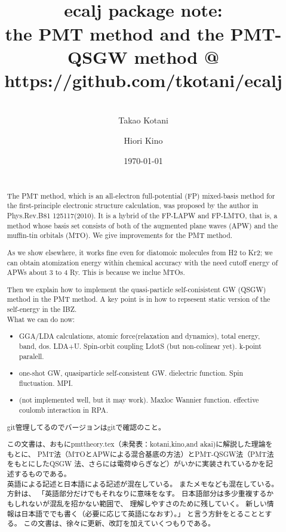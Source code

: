 \documentclass[a4paper,10pt,aip,onecolumn,amsmath,amssymb,floatfix,rmp]{revtex4-1}
\begin{document}
\title{{\Huge \ \\ ecalj package note:}\\ the PMT method and the
PMT-QSGW method  @ https://github.com/tkotani/ecalj}
\author{\large \ \\ Takao Kotani}
\author{\large Hiori Kino}
\date{\today}
\vspace{1cm}
\begin{abstract}
\ \\ The PMT method, which is an all-electron full-potential (FP) mixed-basis
method for the first-principle electronic structure calculation, was proposed 
by the author in Phys.Rev.B81 125117(2010). 
It is a hybrid of the FP-LAPW and FP-LMTO, that is, a method 
whose basis set consists of both of the augmented plane waves (APW) 
and the muffin-tin orbitals (MTO). We give improvements for the PMT
method. 

 As we show elsewhere, it works fine even for diatomoic molecules
from H2 to Kr2; we can obtain atomization energy within chemical
accuracy with the need cutoff energy of APWs about 3 to 4 Ry. This is
because we inclue MTOs.

Then we explain how to implement the quasi-particle
self-conisistent GW (QSGW) method in the PMT method.
A key point is in how to repsesent static version of the self-energy 
in the IBZ.\\

What we can do now:
\begin{itemize}
\item GGA/LDA calculations, atomic force(relaxation and dynamics), total
      energy, band, dos. LDA+U. Spin-orbit coupling LdotS (but
      non-colinear yet). k-point paralell.
\item one-shot GW, quasiparticle self-consistent GW. dielectric function. Spin
      fluctuation. MPI.
\item (not implemented well, but it may work). Maxloc Wannier function.
      effective coulomb interaction in RPA.
\end{itemize}

git管理してるのでバージョンはgitで確認のこと。

この文書は、おもにpmttheory.tex（未発表：kotani,kino,and akai)に解説した理論をもとに、
PMT法（MTOとAPWによる混合基底の方法）とPMT-QSGW法（PMT法をもとにしたQSGW
法、さらには電荷ゆらぎなど）がいかに実装されているかを記述するものである。\\

英語による記述と日本語による記述が混在している。
またメモなども混在している。方針は、
「英語部分だけでもそれなりに意味をなす。
日本語部分は多少重複するかもしれないが混乱を招かない範囲で、
理解しやすさのために残していく。
新しい情報は日本語ででも書く（必要に応じて英語になおす）。」
と言う方針をとることとする。
この文書は、徐々に更新、改訂を加えていくつもりである。
\end{abstract}
\end{document}
